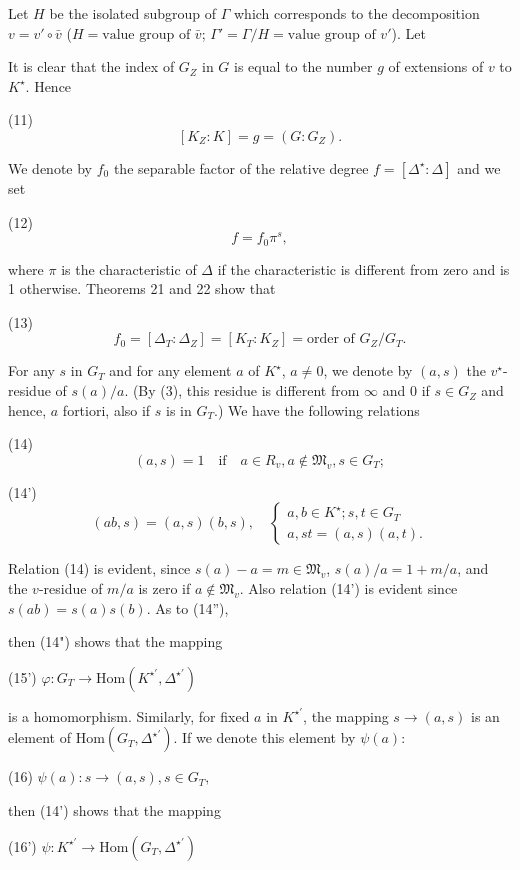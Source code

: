 Let $H$ be the isolated subgroup of $\Gamma$ which corresponds to the decomposition $v = v' \circ \bar{v}$ ($H = \text{value group of } \bar{v}$; $\Gamma' = \Gamma/H = \text{value group of } v'$). Let

It is clear that the index of $G_Z$ in $G$ is equal to the number $g$ of extensions of $v$ to $K^\star$. Hence

(11) $$[K_Z:K] = g = (G:G_Z).$$

We denote by $f_0$ the separable factor of the relative degree $f = [\Delta^\star:\Delta]$ and we set

(12) $$f = f_0\pi^s,$$

where $\pi$ is the characteristic of $\Delta$ if the characteristic is different from zero and is 1 otherwise. Theorems 21 and 22 show that

(13) $$f_0 = [\Delta_T:\Delta_Z] = [K_T:K_Z] = \text{order of } G_Z/G_T.$$

For any $s$ in $G_T$ and for any element $a$ of $K^\star$, $a \neq 0$, we denote by $(a, s)$ the $v^\star$-residue of $s(a)/a$. (By (3), this residue is different from $\infty$ and 0 if $s \in G_Z$ and hence, $a$ fortiori, also if $s$ is in $G_T$.) We have the following relations

(14) $$(a, s) = 1 \quad \text{if} \quad a \in R_v, a \notin \mathfrak{M}_v, s \in G_T;$$

(14') $$(ab, s) = (a, s)(b, s), \quad \left\{ \begin{array}{l} a, b \in K^\star; s, t \in G_T \\ a, st = (a, s)(a, t). \end{array} \right.$$

Relation (14) is evident, since $s(a) - a = m \in \mathfrak{M}_v$, $s(a)/a = 1 + m/a$, and the $v$-residue of $m/a$ is zero if $a \notin \mathfrak{M}_v$. Also relation (14') is evident since $s(ab) = s(a)s(b)$. As to (14''),

then (14") shows that the mapping

(15') $\varphi: G_T \rightarrow \text{Hom} (K^{\star'}, \Delta^{\star'})$

is a homomorphism. Similarly, for fixed $a$ in $K^{\star'}$, the mapping $s \rightarrow (a, s)$ is an element of $\text{Hom} (G_T, \Delta^{\star'})$. If we denote this element by $\psi(a)$:

(16) $\psi(a): s \rightarrow (a, s), s \in G_T,$

then (14') shows that the mapping

(16') $\psi: K^{\star'} \rightarrow \text{Hom} (G_T, \Delta^{\star'})$

